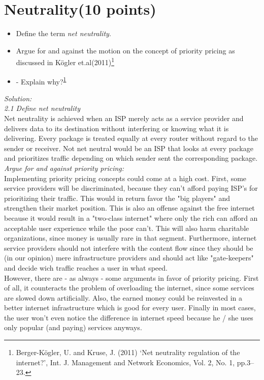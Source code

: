 \documentclass{WeSTassignment}
\begin{document}

\section{Neutrality(10 points)}

\begin{itemize}
\item Define the term \emph{net neutrality}.
\item Argue for and against the motion on the concept of priority pricing as discussed in Kögler et.al(2011)\footnote{\label{note1}Berger-Kögler, U. and Kruse, J. (2011) ‘Net neutrality regulation of the internet?’, Int. J. Management and Network Economics, Vol. 2, No. 1, pp.3–23.}
\item - Explain why?\textsuperscript{\ref{note1}}

\end{itemize}


\emph{Solution:}\\
\emph{2.1 Define net neutrality} \\
Net neutrality is achieved when an ISP merely acts as a service provider and delivers data to its destination without interfering or knowing what it is delivering. Every package is treated equally at every router without regard to the sender or receiver. Not net neutral would be an ISP that looks at every package and prioritizes traffic depending on which sender sent the corresponding package. \\
\emph{Argue for and against priority pricing:}\\
Implementing priority pricing concepts could come at a high cost. First, some service providers will be discriminated, because they can't afford paying ISP's for prioritizing their traffic. This would in return favor the "big players" and strengthen their market position. This is also an offense against the free internet because it would result in a "two-class internet" where only the rich can afford an acceptable user experience while the poor can't. This will also harm charitable organizations, since money is usually rare in that segment. Furthermore, internet service providers should not interfere with the content flow since they should be (in our opinion) mere infrastructure providers and should act like "gate-keepers" and decide wich traffic reaches a user in what speed. \\ However, there are - as always - some arguments in favor of priority pricing. First of all, it counteracts the problem of overloading the internet, since some services are slowed down artificially. Also, the earned money could be reinvested in a better internet infrastructure which is good for every user. Finally in most cases, the user won't even notice the difference in internet speed because he / she uses only popular (and paying) services anyways.



\makefooter
\end{document}
